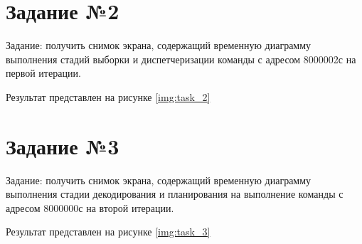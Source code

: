 \section{\textbf{Задание №2}}
Задание: получить снимок экрана, содержащий временную диаграмму выполнения стадий выборки и диспетчеризации команды с адресом 8000002с на первой итерации.

Результат представлен на рисунке \ref{img:task_2}
\begin{figure}[H]
	\captionsetup{justification=centering}
\end{figure}
\section{\textbf{Задание №3}}

Задание: получить снимок экрана, содержащий временную диаграмму выполнения стадии декодирования и планирования на выполнение команды с адресом 8000000с на второй итерации.

Результат представлен на рисунке \ref{img:task_3}
\begin{figure}[H]
	\captionsetup{justification=centering}
\end{figure}

